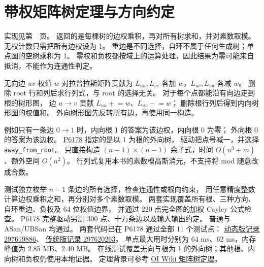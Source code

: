 \section{带权矩阵树定理与方向约定}
实现见第~\pageref{compact-MatrixTree}~页。
返回的是每棵树的边权乘积，再对所有树求和，并对素数取模。
无权计数只需把所有边权设为 1。
重边是不同选择，自环不属于任何生成树；单点图的空树乘积为 1。
零权和负权都按域上的运算处理，因此结果为零可能来自抵消，不能作为连通性判定。

无向边 $uv$ 权值 $w$ 对拉普拉斯矩阵贡献为
$L_{uu},L_{vv}$ 各加 $w$，$L_{uv},L_{vu}$ 各减 $w$。
删除 root 行和列后求行列式，与 root 的选择无关。
对于每个点都能沿有向边走到根的树形图，
边 $u\to v$ 贡献 $L_{uu}\mathrel{+}=w$、$L_{uv}\mathrel{-}=w$；
删除根行列后得到内向树形图的权值和。
外向树形图先反转所有边，再使用同一构造。

例如只有一条边 $0\to1$ 时，内向根 1 的答案为该边权，内向根 0 为零；
外向根 0 的答案为该边权。
\href{https://www.luogu.com.cn/problem/P6178}{P6178} 指定的是以 1 为根的外向树，
驱动把点号减一，并选择 \texttt{away\_from\_root}。
只直接构造 $(n-1)\times(n-1)$ 余子式，时间 $O(n^3+m)$、额外空间 $O(n^2)$。
行列式复用本书的素数模高斯消元，不支持将 mod 随意改成合数。

测试独立枚举 $n-1$ 条边的所有选择，检查连通性或根向约束，
用任意精度整数计算边权乘积之和，再分别对多个素数取模。
两套实现覆盖所有根、三种方向、自环重边、负权及 64 位权值边界，
并通过 220 点完全图的加权 Cayley 公式检查。
P6178 完整驱动另测 300 点、十万条边以及输入输出约定。
普通与 ASan/UBSan 均通过。
两套代码已在 P6178 通过全部 11 个测试点：
\href{https://www.luogu.com.cn/record/297619886}{动态版记录 297619886}、
\href{https://www.luogu.com.cn/record/297620263}{传统版记录 297620263}。
单点最大用时分别为 64 ms、62 ms，内存峰值为 2.85 MB、2.40 MB。
在线测试覆盖无向与根为 1 的外向树；其他根、内向树和负权仍使用本地证据。
定理背景可参考 \href{https://oi-wiki.org/graph/matrix-tree/}{OI Wiki 矩阵树定理}。

